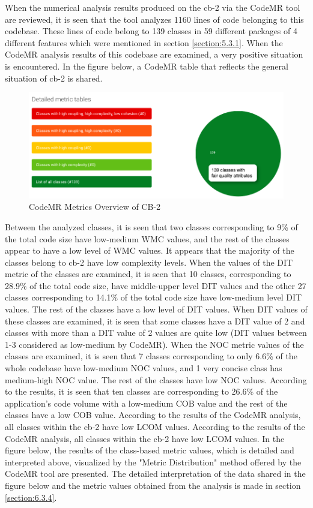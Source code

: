 When the numerical analysis results produced on the cb-2 via the CodeMR tool are reviewed, it is seen that the tool analyzes 1160 lines of code belonging to this codebase. These lines of code belong to 139 classes in 59 different packages of 4 different features which were mentioned in section \ref{section:5.3.1}. When the CodeMR analysis results of this codebase are examined, a very positive situation is encountered. In the figure below, a CodeMR table that reflects the general situation of cb-2 is shared.
\begin{figure}[ht!]
    \centering
    \includegraphics[scale=0.45]{figures/cb-2-metric-table.png}
    \caption{CodeMR Metrics Overview of CB-2}
    \label{fig:cb-2-metric-table.png}
\end{figure}
\FloatBarrier

Between the analyzed classes, it is seen that two classes corresponding to 9\% of the total code size have low-medium WMC values, and the rest of the classes appear to have a low level of WMC values. It appears that the majority of the classes belong to cb-2 have low complexity levels. When the values of the DIT metric of the classes are examined, it is seen that 10 classes, corresponding to 28.9\% of the total code size, have middle-upper level DIT values and the other 27 classes corresponding to 14.1\% of the total code size have low-medium level DIT values. The rest of the classes have a low level of DIT values.  When DIT values of these classes are examined, it is seen that some classes have a DIT value of 2 and classes with more than a DIT value of 2 values are quite low (DIT values between 1-3 considered as low-medium by CodeMR). When the NOC metric values of the classes are examined, it is seen that 7 classes corresponding to only 6.6\% of the whole codebase have low-medium NOC values, and 1 very concise class has medium-high NOC value. The rest of the classes have low NOC values. According to the results, it is seen that ten classes are corresponding to 26.6\% of the application's code volume with a low-medium COB value and the rest of the classes have a low COB value. According to the results of the CodeMR analysis, all classes within the cb-2 have low LCOM values. According to the results of the CodeMR analysis, all classes within the cb-2 have low LCOM values. In the figure below, the results of the class-based metric values, which is detailed and interpreted above, visualized by the "Metric Distribution" method offered by the CodeMR tool are presented. The detailed interpretation of the data shared in the figure below and the metric values obtained from the analysis is made in section \ref{section:6.3.4}.


